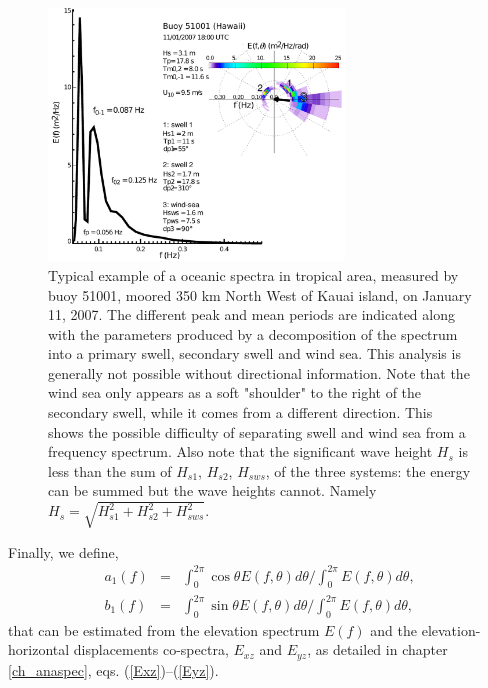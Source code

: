 \begin{figure}[htb]
\centerline{\includegraphics[width=0.7\textwidth]{FIGS_CH_MEASUREMENTS/exemple_spectre_Hawaii.pdf}}
\caption{
Typical example of a oceanic spectra in tropical area, measured by buoy 51001, moored 350 km North West of Kauai island, on January 11, 2007. 
The different peak and mean periods are indicated along with the parameters produced by a decomposition of the spectrum into a primary
swell, secondary swell and wind sea. This analysis is generally not possible without directional information. Note that the wind sea only appears 
as a soft "shoulder" to the right of the secondary swell, while it comes from a different direction. This shows the possible difficulty of 
separating swell and wind sea from a frequency spectrum. Also note that the significant 
wave height $H_s$ is less than the sum of $H_{s1}$, $H_{s2}$, $H_{sws}$, of the three systems: the energy can be summed but the wave heights cannot.
Namely $H_s=\sqrt{H_{s1}^2+H_{s2}^2+H_{sws}^2}$.}
\label{fig:Hawaii_spectrum}
\end{figure}


Finally, we define, 
\begin{eqnarray}
a_{1}(f) & = &\int_{0}^{2\pi} \cos{\theta} E(f,\theta)d\theta /\int_{0}^{2\pi} E(f,\theta)d\theta, \label{a1def} \\
b_{1}(f) & = & \int_{0}^{2\pi} \sin{\theta} E(f,\theta)d\theta /\int_{0}^{2\pi} E(f,\theta)d\theta ,\label{b1def} 
\end{eqnarray}
that can be estimated from the elevation spectrum $E(f)$ and the elevation-horizontal displacements
co-spectra, $E_{xz}$ and  $E_{yz}$, as detailed in chapter \ref{ch_anaspec},   eqs. (\ref{Exz})--(\ref{Eyz}). 

